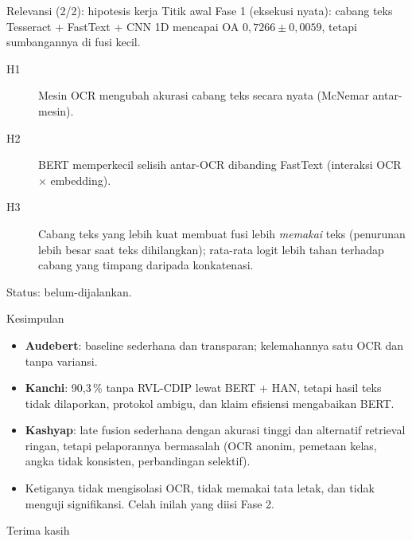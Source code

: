 \documentclass[aspectratio=169,10pt]{beamer}
\newcommand\kecil{\fontsize{8}{9.5}\selectfont}
\begin{document}
\begin{frame}{Relevansi (2/2): hipotesis kerja}
  Titik awal Fase 1 (eksekusi nyata): cabang teks Tesseract + FastText + CNN 1D mencapai
  OA $0{,}7266 \pm 0{,}0059$, tetapi sumbangannya di fusi kecil.

  \vspace{6pt}
  \begin{description}
    \item[H1] Mesin OCR mengubah akurasi cabang teks secara nyata (McNemar antar-mesin).
    \item[H2] BERT memperkecil selisih antar-OCR dibanding FastText (interaksi OCR $\times$ embedding).
    \item[H3] Cabang teks yang lebih kuat membuat fusi lebih \emph{memakai} teks (penurunan lebih
          besar saat teks dihilangkan); rata-rata logit lebih tahan terhadap cabang yang timpang
          daripada konkatenasi.
  \end{description}
  \vspace{4pt}
  {\kecil Status: belum-dijalankan.}
\end{frame}

\begin{frame}{Kesimpulan}
  \begin{itemize}
    \item \textbf{Audebert}: baseline sederhana dan transparan; kelemahannya satu OCR dan tanpa variansi.
    \item \textbf{Kanchi}: 90,3\,\% tanpa RVL-CDIP lewat BERT + HAN, tetapi hasil teks tidak
          dilaporkan, protokol ambigu, dan klaim efisiensi mengabaikan BERT.
    \item \textbf{Kashyap}: late fusion sederhana dengan akurasi tinggi dan alternatif retrieval
          ringan, tetapi pelaporannya bermasalah (OCR anonim, pemetaan kelas, angka tidak
          konsisten, perbandingan selektif).
    \item Ketiganya tidak mengisolasi OCR, tidak memakai tata letak, dan tidak menguji signifikansi.
          Celah inilah yang diisi Fase 2.
  \end{itemize}
\end{frame}

\begin{frame}[standout]
  Terima kasih
\end{frame}
\end{document}

